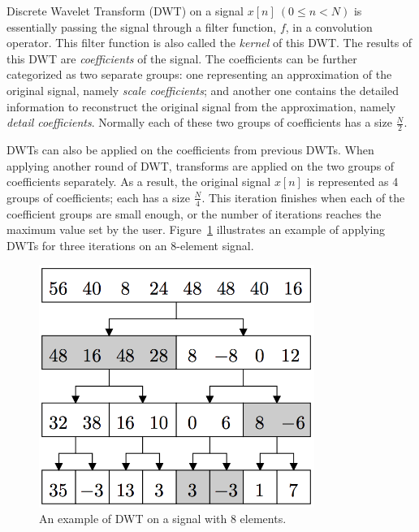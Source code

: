 Discrete Wavelet Transform (DWT) on a signal $x[n] \: (0 \leq n < N)$ is essentially
passing the signal through a filter function, $f$, 
in a convolution operator.
%
This filter function is also called the \textit{kernel} of this DWT.
%
The results of this DWT are \textit{coefficients} of the signal.
%
The coefficients can be further categorized as two separate groups: 
one representing an approximation of the original signal,
namely \textit{scale coefficients};
and another one contains the detailed information to reconstruct
the original signal from the approximation, namely 
\textit{detail coefficients}.
%
Normally each of these two groups of coefficients has a size $\frac{N}{2}$.


DWTs can also be applied on the coefficients from previous DWTs.
%
When applying another round of DWT, transforms are applied on the two
groups of coefficients separately.
%
As a result, the original signal $x[n]$ is represented as 4 groups of 
coefficients; each has a size $\frac{N}{4}$.
%
This iteration finishes when each of the coefficient groups are small enough,
or the number of iterations reaches the maximum value set by the user. 
%
%
%
Figure~\ref{fig:example1} illustrates an example of applying DWTs for 
three iterations on an 8-element signal.



\begin{figure}
    \centering
    \includegraphics[width=0.8\textwidth]{fig/example1.png}
    \caption{An example of DWT on a signal with 8 elements.}
    \label{fig:example1}
\end{figure}


